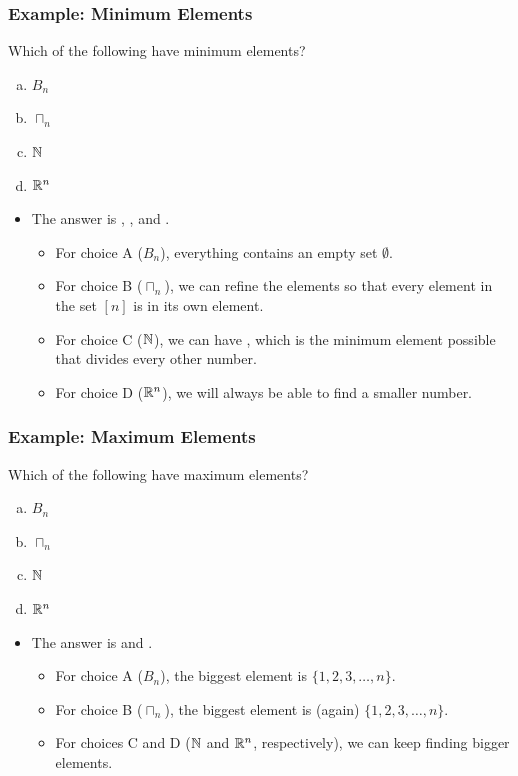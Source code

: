 \documentclass[letterpaper]{article}
\begin{document}
\subsubsection{Example: Minimum Elements}
Which of the following have minimum elements? 
\begin{enumerate}[(a)]
    \item $B_n$
    \item $\sqcap_n$
    \item $\mathbb{N}$
    \item $\mathbb{R}^n$
\end{enumerate}

\begin{itemize}
    \item The answer is , , and .
    \begin{itemize}
        \item For choice A ($B_n$), everything contains an empty set $\emptyset$. 
        \item For choice B ($\sqcap_n$), we can refine the elements so that every element in the set $[n]$ is in its own element. 
        \item For choice C ($\mathbb{N}$), we can have , which is the minimum element possible that divides every other number. 
        \item For choice D ($\mathbb{R}^n$), we will always be able to find a smaller number. 
    \end{itemize}
\end{itemize}

\subsubsection{Example: Maximum Elements}
Which of the following have maximum elements? 
\begin{enumerate}[(a)]
    \item $B_n$
    \item $\sqcap_n$
    \item $\mathbb{N}$
    \item $\mathbb{R}^n$
\end{enumerate}

\begin{itemize}
    \item The answer is  and .
    \begin{itemize}
        \item For choice A ($B_n$), the biggest element is $\{1, 2, 3, \dots, n\}$.
        \item For choice B ($\sqcap_n$), the biggest element is (again) $\{1, 2, 3, \dots, n\}$.
        \item For choices C and D ($\mathbb{N}$ and $\mathbb{R}^n$, respectively), we can keep finding bigger elements. 
    \end{itemize}
\end{itemize}
\end{document}
